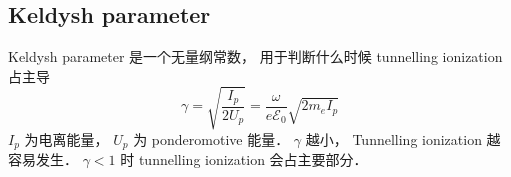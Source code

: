 \subsection{Keldysh parameter}
Keldysh parameter 是一个无量纲常数， 用于判断什么时候 tunnelling ionization 占主导
\begin{equation}
\gamma = \sqrt{\frac{I_p}{2U_p}} = \frac{\omega}{e\mathcal E_0} \sqrt{2m_e I_p}
\end{equation}
$I_p$ 为电离能量， $U_p$ 为 ponderomotive 能量． $\gamma$ 越小， Tunnelling ionization 越容易发生． $\gamma < 1$ 时 tunnelling ionization 会占主要部分．
